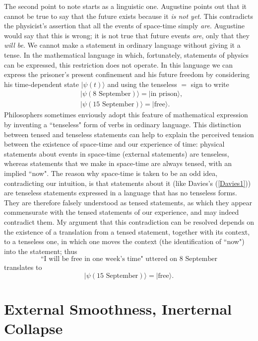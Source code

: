\documentclass[12pt,a4paper,reqno]{article}
\renewcommand{\(}{\left(}
\renewcommand{\)}{\right)}
\newcommand{\<}{\langle}
\renewcommand{\>}{\rangle}
\theoremstyle{plain} %
\theoremstyle{definition}
\theoremstyle{remark}
\begin{document}
The second point to note starts as a linguistic one. Augustine points
out that it cannot be true to say that the future exists because it
\emph{is not yet}. This contradicts the physicist's assertion that all
the events of space-time simply \emph{are}. Augustine would say that
this is wrong; it is not true that future events \emph{are}, only that
they \emph{will be}. We cannot make a statement in ordinary language
without giving it a tense. In the mathematical language in which,
fortunately, statements of physics can be expressed, this restriction
does not operate. In this language we can express the prisoner's present
confinement and his future freedom by considering his time-dependent
state $|\psi(t)\>$ and using the tenseless $=$ sign to write
\begin{align*}
&|\psi(\text{8 September})\> = |\text{in prison}\>,\\
&|\psi(\text{15 September})\> = |\text{free}\>.
\end{align*}
Philosophers sometimes enviously adopt this feature of mathematical expression
by inventing a ``tenseless" form of verbs in ordinary language. This
distinction between tensed and tenseless statements can help to explain
the perceived tension between the existence of space-time and our
experience of time: physical statements about events in space-time
(external statements) are tenseless, whereas statements that we make in
space-time are always tensed, with an implied ``now". The reason
why space-time is taken to be an odd idea, contradicting our intuition,
is that statements about it (like Davies's (\ref{Davies1})) are
tenseless statements expressed in a language that has no tenseless
forms. They are therefore falsely understood as tensed statements, as which they
appear commensurate with the tensed statements of our experience, and
may indeed contradict them. My argument that
this contradiction can be resolved depends on the existence of a translation
from a tensed statement, together with its context, to a tenseless
one, in which one moves the context (the identification of ``now") into
the statement; thus 
\[
\text{``I will be free in one week's time" uttered on 8 September}
\]
translates to 
\[
|\psi(\text{15 September})\> = |\text{free}\>.
\]

\medskip
\section{External Smoothness, Inerternal Collapse}
\end{document}
